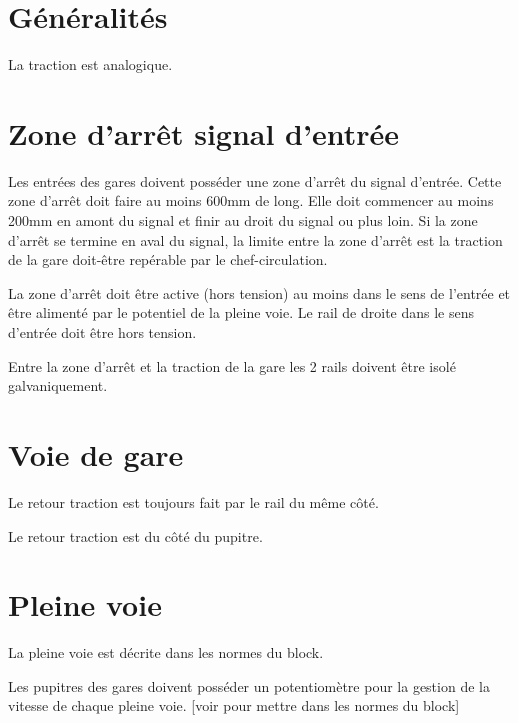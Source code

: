
\section{Généralités}

La traction est analogique.

\section{Zone d'arrêt signal d'entrée}

Les entrées des gares doivent posséder une zone d'arrêt du signal d'entrée. 
Cette zone d'arrêt doit faire au moins 600mm de long. 
Elle doit commencer au moins 200mm en amont du signal et finir au droit du signal ou plus loin. 
Si la zone d'arrêt se termine en aval du signal, la limite entre la zone d'arrêt est la traction de la gare doit-être repérable par le chef-circulation. 

La zone d'arrêt doit être active (hors tension) au moins dans le sens de l'entrée et être alimenté par le potentiel de la pleine voie. 
Le rail de droite dans le sens d'entrée doit être hors tension.

Entre la zone d'arrêt et la traction de la gare les 2 rails doivent être isolé galvaniquement.

\section{Voie de gare}

Le retour traction est toujours fait par le rail du même côté.

Le retour traction est du côté du pupitre.

\section{Pleine voie}

La pleine voie est décrite dans les normes du block.

Les pupitres des gares doivent posséder un potentiomètre pour la gestion de la vitesse de chaque pleine voie. 
[voir pour mettre dans les normes du block]
